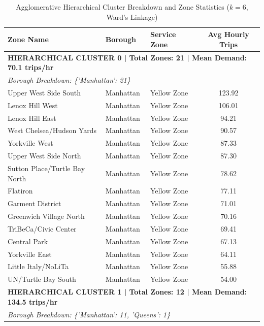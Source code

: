\documentclass[11pt,a4paper]{article}
\begin{document}
\begin{table}[htbp]
    \centering
    \small
    \caption{Agglomerative Hierarchical Cluster Breakdown and Zone Statistics ($k = 6$, Ward's Linkage)}
    \label{tab:hierarchical_exact_clusters}
    \begin{tabular}{lllc}
        \toprule
        \textbf{Zone Name} & \textbf{Borough} & \textbf{Service Zone} & \textbf{Avg Hourly Trips} \\
        \midrule
        \multicolumn{4}{l}{\textbf{HIERARCHICAL CLUSTER 0 | Total Zones: 21 | Mean Demand: 70.1 trips/hr}} \\
        \multicolumn{4}{l}{\textit{Borough Breakdown: \{'Manhattan': 21\}}} \\
        \midrule
        Upper West Side South & Manhattan & Yellow Zone & 123.92 \\
        Lenox Hill West & Manhattan & Yellow Zone & 106.01 \\
        Lenox Hill East & Manhattan & Yellow Zone & 94.21 \\
        West Chelsea/Hudson Yards & Manhattan & Yellow Zone & 90.57 \\
        Yorkville West & Manhattan & Yellow Zone & 87.33 \\
        Upper West Side North & Manhattan & Yellow Zone & 87.30 \\
        Sutton Place/Turtle Bay North & Manhattan & Yellow Zone & 78.62 \\
        Flatiron & Manhattan & Yellow Zone & 77.11 \\
        Garment District & Manhattan & Yellow Zone & 71.01 \\
        Greenwich Village North & Manhattan & Yellow Zone & 70.16 \\
        TriBeCa/Civic Center & Manhattan & Yellow Zone & 69.41 \\
        Central Park & Manhattan & Yellow Zone & 67.13 \\
        Yorkville East & Manhattan & Yellow Zone & 64.11 \\
        Little Italy/NoLiTa & Manhattan & Yellow Zone & 55.88 \\
        UN/Turtle Bay South & Manhattan & Yellow Zone & 54.00 \\
        \midrule
        \multicolumn{4}{l}{\textbf{HIERARCHICAL CLUSTER 1 | Total Zones: 12 | Mean Demand: 134.5 trips/hr}} \\
        \multicolumn{4}{l}{\textit{Borough Breakdown: \{'Manhattan': 11, 'Queens': 1\}}} \\

\end{tabular}
\end{table}
\end{document}
